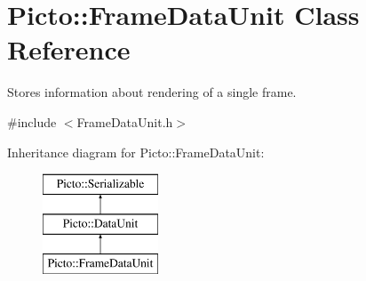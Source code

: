 \hypertarget{class_picto_1_1_frame_data_unit}{\section{Picto\-:\-:Frame\-Data\-Unit Class Reference}
\label{class_picto_1_1_frame_data_unit}
}


Stores information about rendering of a single frame.  




{\ttfamily \#include $<$Frame\-Data\-Unit.\-h$>$}

Inheritance diagram for Picto\-:\-:Frame\-Data\-Unit\-:\begin{figure}[H]
\begin{center}
\leavevmode
\includegraphics[height=3.000000cm]{class_picto_1_1_frame_data_unit}
\end{center}
\end{figure}
